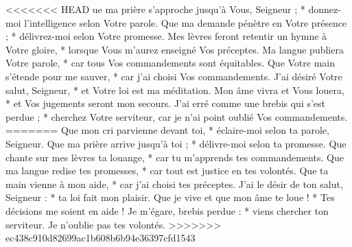 <<<<<<< HEAD
ue ma prière s'approche jusqu'à Vous, Seigneur ; * donnez-moi l'intelligence selon Votre parole.
\versseparator
Que ma demande pénètre en Votre présence ; * délivrez-moi selon Votre promesse.
\versseparator
Mes lèvres feront retentir un hymne à Votre gloire, * lorsque Vous m'aurez enseigné Vos préceptes.
\versseparator
Ma langue publiera Votre parole, * car tous Vos commandements sont équitables.
\versseparator
Que Votre main s'étende pour me sauver, * car j'ai choisi Vos commandements.
\versseparator
J'ai désiré Votre salut, Seigneur, * et Votre loi est ma méditation.
\versseparator
Mon âme vivra et Vous louera, * et Vos jugements seront mon secours.
\versseparator
J'ai erré comme une brebis qui s'est perdue ; * cherchez Votre serviteur, car je n'ai point oublié Vos commandements.
=======
Que mon cri parvienne devant toi, *
éclaire-moi selon ta parole, Seigneur.
\versseparator
Que ma prière arrive jusqu’à toi ; *
délivre-moi selon ta promesse.
\versseparator
Que chante sur mes lèvres ta louange, *
car tu m’apprends tes commandements.
\versseparator
Que ma langue redise tes promesses, *
car tout est justice en tes volontés.
\versseparator
Que ta main vienne à mon aide, *
car j’ai choisi tes préceptes.
\versseparator
J’ai le désir de ton salut, Seigneur : *
ta loi fait mon plaisir.
\versseparator
Que je vive et que mon âme te loue ! *
Tes décisions me soient en aide !
\versseparator
Je m’égare, brebis perdue : *
viens chercher ton serviteur.
Je n’oublie pas tes volontés.
>>>>>>> ec438c910d82699ac1b608b6b94e36397cfd1543
